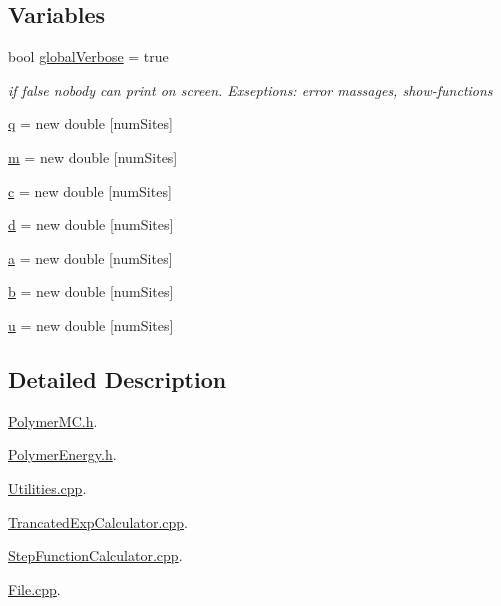 \subsection*{Variables}
\begin{DoxyCompactItemize}
\item 
bool \hyperlink{namespace_p_c_a_a01cf2b18a2d7669f5be721c2142bf67d}{global\+Verbose} = true
\begin{DoxyCompactList}\small\item\em if false nobody can print on screen. Exseptions\+: error massages, show-\/functions \end{DoxyCompactList}\item 
\hyperlink{namespace_p_c_a_a5182a7edfe31f7477e5335bc60fcf108}{q} = new double \mbox{[}num\+Sites\mbox{]}
\item 
\hyperlink{namespace_p_c_a_acfc8187195fb96910fe83d4ff79b3239}{m} = new double \mbox{[}num\+Sites\mbox{]}
\item 
\hyperlink{namespace_p_c_a_a4e2c91089d5d84755539f212ad87f02a}{c} = new double \mbox{[}num\+Sites\mbox{]}
\item 
\hyperlink{namespace_p_c_a_abf43edb3e63963e603bf8c8ce20abf94}{d} = new double \mbox{[}num\+Sites\mbox{]}
\item 
\hyperlink{namespace_p_c_a_a7ba252167ecbbceaa608cd406810aa1f}{a} = new double \mbox{[}num\+Sites\mbox{]}
\item 
\hyperlink{namespace_p_c_a_a92ab50a62efb8eaa1bcd8e279828125b}{b} = new double \mbox{[}num\+Sites\mbox{]}
\item 
\hyperlink{namespace_p_c_a_a4a22821642ff929e86e49ad05b7545ad}{u} = new double \mbox{[}num\+Sites\mbox{]}
\end{DoxyCompactItemize}


\subsection{Detailed Description}
\hyperlink{_polymer_m_c_8h}{Polymer\+M\+C.\+h}. 

\hyperlink{_polymer_energy_8h}{Polymer\+Energy.\+h}.

\hyperlink{_utilities_8cpp}{Utilities.\+cpp}.

\hyperlink{_trancated_exp_calculator_8cpp}{Trancated\+Exp\+Calculator.\+cpp}.

\hyperlink{_step_function_calculator_8cpp}{Step\+Function\+Calculator.\+cpp}.

\hyperlink{_file_8cpp}{File.\+cpp}.

